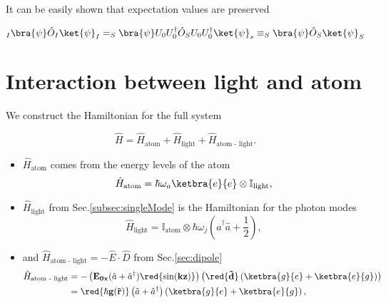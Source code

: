 It can be easily shown that expectation values are preserved

\begin{equation}
_I\bra{\psi}\hat{O}_I\ket{\psi}_I = _S\bra{\psi}U_0U_0^\dagger\hat{O}_SU_0U_0^\dagger\ket{\psi}_s \equiv _S\bra{\psi}\hat{O}_S\ket{\psi}_S
\end{equation}

\newpage 
\section{Interaction between light and atom \label{sec:lightAtom}}
We construct the Hamiltonian for the full system

\begin{equation}
\hat{H} = \hat{H}_\text{atom} + \hat{H}_\text{light} + \hat{H}_\text{atom - light}. 
\end{equation}

\begin{itemize}
	\item $\hat{H}_\text{atom}$ comes from the energy levels of the atom
	\begin{equation}
	\label{eqn:atomHamiltonian}
	\hat{H}_\text{atom} = \hbar\omega_a\ketbra{e}{e}\otimes\mathbb{I}_\text{light},
	\end{equation}
	
	\item $\hat{H}_\text{light}$ from Sec.\ref{subsec:singleMode} is the Hamiltonian for the photon modes
	\begin{equation}
	\label{eqn:lightHamiltonian}
	\hat{H}_\text{light} = \mathbb{I}_\text{atom} \otimes \hbar\omega_j\left(\hat{a}^\dagger\hat{a}+\frac{1}{2}\right),
	\end{equation}
	
	\item and $\hat{H}_\text{atom - light} = - \hat{E}\cdot \hat{D} $ from Sec.\ref{sec:dipole}
	\begin{equation}
	\begin{aligned}
	\hat{H}_\text{atom - light} & = - \left(\mathbf{E_{0x}}(\hat{a}+\hat{a}^\dagger)\mathbf{\red{\sin(kz)}}\right)\left(\red{\mathbf{\vec{d}}}\left(\ketbra{g}{e}+\ketbra{e}{g}\right)\right)\\
	& = \mathbf{\red{\hbar g(\vec{r})}}\left(\hat{a}+\hat{a}^\dagger\right)\left(\ketbra{g}{e}+\ketbra{e}{g}\right),
	\end{aligned}
	\end{equation}	
\end{itemize}  

